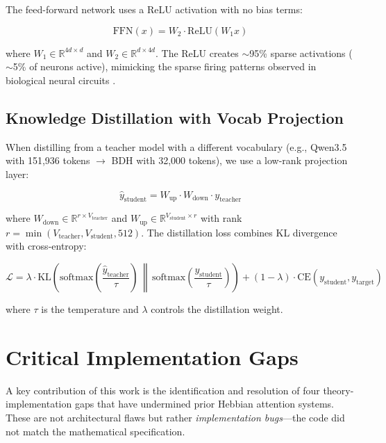 \documentclass{article}
\begin{document}
The feed-forward network uses a ReLU activation with no bias terms:

\begin{equation}
\text{FFN}(x) = W_2 \cdot \text{ReLU}(W_1 x)
\end{equation}

where $W_1 \in \mathbb{R}^{4d \times d}$ and $W_2 \in \mathbb{R}^{d \times 4d}$. The ReLU creates $\sim$95\% sparse activations ($\sim$5\% of neurons active), mimicking the sparse firing patterns observed in biological neural circuits \citep{olshausen1996emergence}.

\subsection{Knowledge Distillation with Vocab Projection}

When distilling from a teacher model with a different vocabulary (e.g., Qwen3.5 with 151,936 tokens $\to$ BDH with 32,000 tokens), we use a low-rank projection layer:

\begin{equation}
\hat{y}_{\text{student}} = W_{\text{up}} \cdot W_{\text{down}} \cdot y_{\text{teacher}}
\end{equation}

where $W_{\text{down}} \in \mathbb{R}^{r \times V_{\text{teacher}}}$ and $W_{\text{up}} \in \mathbb{R}^{V_{\text{student}} \times r}$ with rank $r = \min(V_{\text{teacher}}, V_{\text{student}}, 512)$. The distillation loss combines KL divergence with cross-entropy:

\begin{equation}
\mathcal{L} = \lambda \cdot \text{KL}\left(\text{softmax}\left(\frac{\hat{y}_{\text{teacher}}}{\tau}\right) \,\middle\|\, \text{softmax}\left(\frac{y_{\text{student}}}{\tau}\right)\right) + (1-\lambda) \cdot \text{CE}(y_{\text{student}}, y_{\text{target}})
\end{equation}

where $\tau$ is the temperature and $\lambda$ controls the distillation weight.

\section{Critical Implementation Gaps}

A key contribution of this work is the identification and resolution of four theory-implementation gaps that have undermined prior Hebbian attention systems. These are not architectural flaws but rather \textit{implementation bugs}---the code did not match the mathematical specification.
\end{document}
